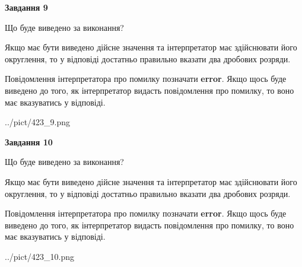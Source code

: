 \documentclass[12pt, ukrainian]{article}
\begin{document}
{\begin {Large}
{\begin {center}\textbf{Завдання 9}\end {center}}\par
Що буде виведено за виконання? \par

Якщо має бути виведено дійсне значення та інтерпретатор має здійснювати його округлення, 
то у відповіді достатньо правильно вказати два дробових розряди.

Повідомлення інтерпретатора про помилку позначати \textbf{error}.
Якщо щось буде виведено до того, як інтерпретатор видасть повідомлення про помилку, 
то воно має вказуватись у відповіді. \par

\begin{center}
	{../pict/423_9.png}
\end{center}
\newpage

{\begin {center}\textbf{Завдання 10}\end {center}}\par
Що буде виведено за виконання? \par

Якщо має бути виведено дійсне значення та інтерпретатор має здійснювати його округлення, 
то у відповіді достатньо правильно вказати два дробових розряди.

Повідомлення інтерпретатора про помилку позначати \textbf{error}.
Якщо щось буде виведено до того, як інтерпретатор видасть повідомлення про помилку, 
то воно має вказуватись у відповіді. \par

\begin{center}
	{../pict/423_10.png}
\end{center}
\newpage

\end {Large}}
\end{document}
